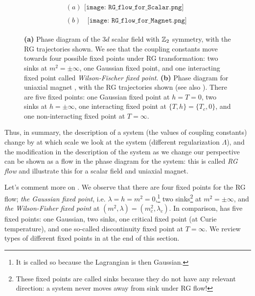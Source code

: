 \begin{figure}
	\centering 
	\begin{gather*}
		(a)\begin{aligned}
			\texttt{[image: RG\_flow\_for\_Scalar.png]}
		\end{aligned}\\ 
		(b)\;\;
		\begin{aligned}
			\texttt{[image: RG\_flow\_for\_Magnet.png]}
		\end{aligned}
	\end{gather*}
	\caption[RG flows for the $3d$ scalar field and the uniaxial magnet]{\label{fig: Wilson-fisher}\textbf{(a)} Phase diagram of the $3d$ scalar field with $\mathbb{Z}_2$ symmetry, with the RG trajectories shown. We see that the coupling constants move towards four possible fixed points under RG transformation: two sinks at $m^2=\pm\infty$, one Gaussian fixed point, and one interacting fixed point called \emph{Wilson-Fischer fixed point}. \textbf{(b)} Phase diagram for uniaxial magnet , with the RG trajectories shown (see also \figref{\ref{fig: phase diagram}}). There are five fixed points: one Gaussian fixed point at $h=T=0$, two sinks at $h=\pm\infty$, one interacting fixed point at $\{T,h\}=\{T_c,0\}$, and one non-interacting fixed point at $T=\infty$.}
\end{figure}
Thus, in summary, the description of a system (the values of coupling constants) change by at which scale we look at the system (different regularization $\Lambda$), and the modification in the description of the system as we change our perspective can be shown as a flow in the phase diagram for the system: this is called \emph{RG flow} and \figref{\ref{fig: Wilson-fisher}} illustrate this for a scalar field and uniaxial magnet.

Let's comment more on . We observe that there are four fixed points for the RG flow; \emph{the Gaussian fixed point}, i.e. $\lambda=h=m^2=0$,\footnote{It is called so because the Lagrangian is then Gaussian.} two sinks\footnote{These fixed points are called sinks because they do not have any relevant direction: a system never moves away from sink under RG flow!} at $m^2=\pm\infty$, and \emph{the Wilson-Fisher fixed point} at $(m^2,\lambda)=(m^2_c,\lambda_c)$. In comparison,  has five fixed points: one Gaussian, two sinks, one critical fixed point (at Curie temperature), and one so-called discontinuity fixed point at $T=\infty$. We review types of different fixed points in \tabref{\ref{table:classification of fixed points}} at the end of this section.

